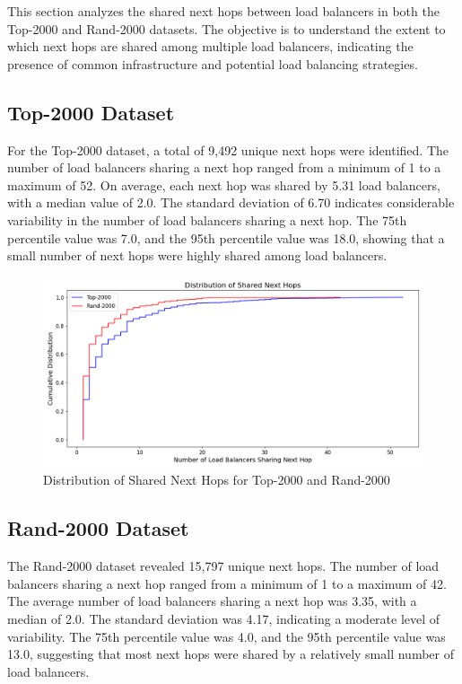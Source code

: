 \documentclass[12pt]{cwru_thesis}
\begin{document}
This section analyzes the shared next hops between load balancers in both the Top-2000 and Rand-2000 datasets. The objective is to understand the extent to which next hops are shared among multiple load balancers, indicating the presence of common infrastructure and potential load balancing strategies.

\subsection{Top-2000 Dataset}

For the Top-2000 dataset, a total of 9,492 unique next hops were identified. The number of load balancers sharing a next hop ranged from a minimum of 1 to a maximum of 52. On average, each next hop was shared by 5.31 load balancers, with a median value of 2.0. The standard deviation of 6.70 indicates considerable variability in the number of load balancers sharing a next hop. The 75th percentile value was 7.0, and the 95th percentile value was 18.0, showing that a small number of next hops were highly shared among load balancers.

\begin{figure}[h!]
    \centering
    \includegraphics[width=\linewidth]{figures/shared_next_hops_combined.png}
    \caption{Distribution of Shared Next Hops for Top-2000 and Rand-2000}
    \label{fig:shared_next_hops_combined}
\end{figure}

\subsection{Rand-2000 Dataset}

The Rand-2000 dataset revealed 15,797 unique next hops. The number of load balancers sharing a next hop ranged from a minimum of 1 to a maximum of 42. The average number of load balancers sharing a next hop was 3.35, with a median of 2.0. The standard deviation was 4.17, indicating a moderate level of variability. The 75th percentile value was 4.0, and the 95th percentile value was 13.0, suggesting that most next hops were shared by a relatively small number of load balancers.
\newpage
\end{document}
